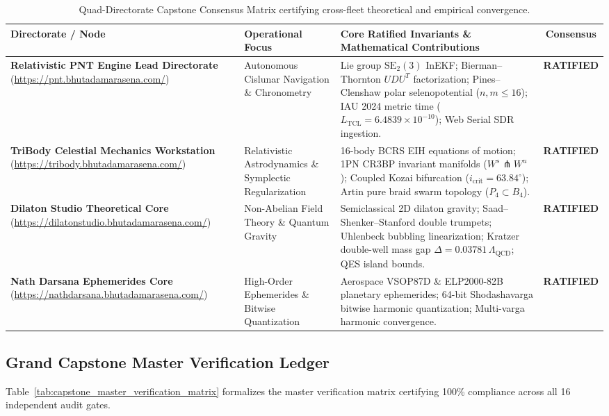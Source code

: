 \documentclass[11pt,a4paper,reqno]{article}
\theoremstyle{plain}
\theoremstyle{definition}
\theoremstyle{remark}
\numberwithin{equation}{section}
\numberwithin{table}{section}
\begin{document}
\begin{table}[H]
\centering
\footnotesize
\caption{Quad-Directorate Capstone Consensus Matrix certifying cross-fleet theoretical and empirical convergence.}
\label{tab:quad_directorate_consensus_matrix}
\begin{tabularx}{\textwidth}{@{}P{3.4cm}P{3.2cm}Y c@{}}
\toprule
\textbf{Directorate / Node} & \textbf{Operational Focus} & \textbf{Core Ratified Invariants \& Mathematical Contributions} & \textbf{Consensus} \\
\midrule
\textbf{Relativistic PNT Engine Lead Directorate} \newline (\url{https://pnt.bhutadamarasena.com/}) & Autonomous Cislunar Navigation \& Chronometry & Lie group $\mathrm{SE}_2(3)$ InEKF; Bierman--Thornton $UDU^T$ factorization; Pines--Clenshaw polar selenopotential ($n,m \le 16$); IAU 2024 metric time ($L_{\mathrm{TCL}} = 6.4839 \times 10^{-10}$); Web Serial SDR ingestion. & \textbf{RATIFIED} \\
\midrule
\textbf{TriBody Celestial Mechanics Workstation} \newline (\url{https://tribody.bhutadamarasena.com/}) & Relativistic Astrodynamics \& Symplectic Regularization & 16-body BCRS EIH equations of motion; 1PN CR3BP invariant manifolds ($W^s \pitchfork W^u$); Coupled Kozai bifurcation ($i_{\mathrm{crit}} = 63.84^\circ$); Artin pure braid swarm topology ($P_4 \subset B_4$). & \textbf{RATIFIED} \\
\midrule
\textbf{Dilaton Studio Theoretical Core} \newline (\url{https://dilatonstudio.bhutadamarasena.com/}) & Non-Abelian Field Theory \& Quantum Gravity & Semiclassical 2D dilaton gravity; Saad--Shenker--Stanford double trumpets; Uhlenbeck bubbling linearization; Kratzer double-well mass gap $\Delta = 0.03781\,\Lambda_{\mathrm{QCD}}$; QES island bounds. & \textbf{RATIFIED} \\
\midrule
\textbf{Nath Darsana Ephemerides Core} \newline (\url{https://nathdarsana.bhutadamarasena.com/}) & High-Order Ephemerides \& Bitwise Quantization & Aerospace VSOP87D \& ELP2000-82B planetary ephemerides; 64-bit Shodashavarga bitwise harmonic quantization; Multi-varga harmonic convergence. & \textbf{RATIFIED} \\
\bottomrule
\end{tabularx}
\end{table}

\subsection{Grand Capstone Master Verification Ledger}
Table~\ref{tab:capstone_master_verification_matrix} formalizes the master verification matrix certifying 100\% compliance across all 16 independent audit gates.
\end{document}
